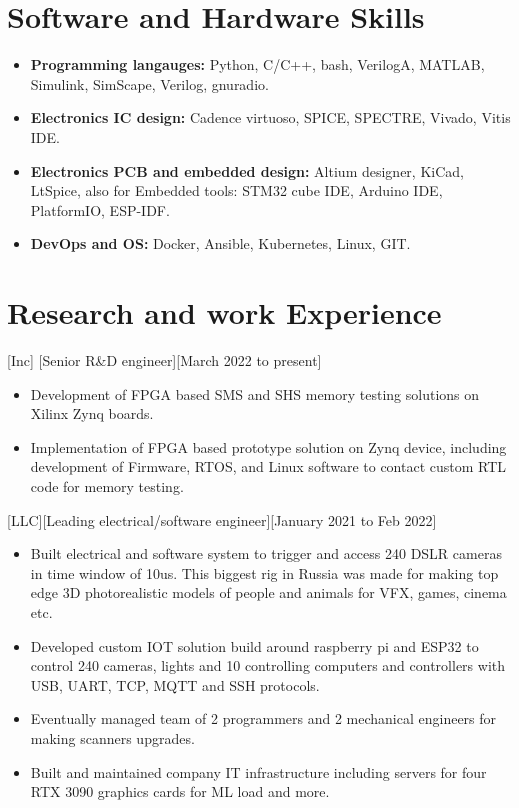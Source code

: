 \documentclass{article}
\begin{document}
\section{Software and Hardware Skills}
\begin{itemize}
\item \textbf{Programming langauges:} Python, C/C++, bash, VerilogA, MATLAB, Simulink, SimScape, Verilog, gnuradio. 
\item \textbf{Electronics IC design:} Cadence virtuoso, SPICE, SPECTRE, Vivado, Vitis IDE.
\item \textbf{Electronics PCB and embedded design:} Altium designer, KiCad, LtSpice, also for Embedded tools: STM32 cube IDE, Arduino IDE, PlatformIO, ESP-IDF.
\item \textbf{DevOps and OS:} Docker, Ansible, Kubernetes, Linux, GIT.
\end{itemize}

\section{Research and work Experience}
 

 
[Inc]
[Senior R\&D engineer][March 2022 to present]
   \begin{itemize}
      \item Development of FPGA based SMS and SHS memory testing solutions on Xilinx Zynq boards.
      \item Implementation of FPGA based prototype solution on Zynq device, including development of Firmware, RTOS, and Linux software to contact custom RTL code for memory testing. 
   \end{itemize}

[LLC][Leading electrical/software engineer][January 2021 to Feb 2022]
\begin{itemize}
   \item Built electrical and software system to trigger and access 240 DSLR cameras in time window of 10us. This biggest rig in Russia was made for making top edge 3D photorealistic models of people and animals for VFX, games, cinema etc.
   \item Developed custom IOT solution build around raspberry pi and ESP32 to control 240 cameras, lights and 10 controlling computers and controllers with USB, UART, TCP, MQTT and SSH protocols.
   \item Eventually managed team of 2 programmers and 2 mechanical engineers for making scanners upgrades.
   \item Built and maintained company IT infrastructure including servers for four RTX 3090 graphics cards for ML load and more.
   \end{itemize}
\end{document}
